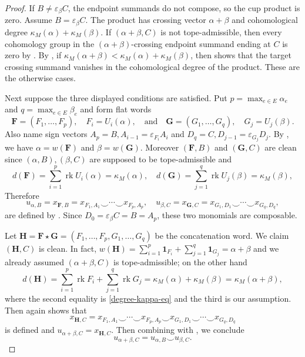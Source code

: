 \documentclass[10pt,a4paper]{amsart}
\newcommand{\bF}{\boldsymbol{F}}
\newcommand{\bG}{\boldsymbol{G}}
\newcommand{\bH}{\boldsymbol{H}}
\newcommand{\eps}{\varepsilon}
\newcommand{\one}{\mathbf{1}}
\newcommand{\rk}{\operatorname{rk}}
\begin{document}
\begin{proof}
If $B\neq\eps_\beta C$, the endpoint summands do not compose, so the cup product is zero. Assume $B=\eps_\beta C$. The product has crossing vector $\alpha+\beta$ and cohomological degree $\kappa_M(\alpha)+\kappa_M(\beta)$. If $(\alpha+\beta,C)$ is not tope-admissible, then every cohomology group in the $(\alpha+\beta)$-crossing endpoint summand ending at $C$ is zero by . By , if $\kappa_M(\alpha+\beta)<\kappa_M(\alpha)+\kappa_M(\beta)$, then  shows that the target crossing summand vanishes in the cohomological degree of the product. These are the otherwise cases.

Next suppose the three displayed conditions are satisfied. Put $p=\max_{e\in E}\alpha_e$ and $q=\max_{e\in E}\beta_e$ and form flat words
\[
\bF=(F_1,\ldots,F_p),\quad F_i=U_i(\alpha), \quad \text{and} \quad \bG=(G_1,\ldots,G_q),\quad G_j=U_j(\beta).
\]
Also name sign vectors $A_p=B, A_{i-1}=\eps_{F_i}A_i$ and $D_q=C, D_{j-1}=\eps_{G_j}D_j$. By , we have $\alpha=w(\bF)$ and $\beta=w(\bG)$. Moreover $(\bF,B)$ and $(\bG,C)$ are clean since $(\alpha,B),(\beta,C)$ are supposed to be tope-admissible and 
\begin{equation}\label{degree-kappa-eq}
d(\bF)=\sum_{i=1}^p\rk U_i(\alpha)=\kappa_M(\alpha),\quad d(\bG)=\sum_{j=1}^q\rk U_j(\beta)=\kappa_M(\beta),  
\end{equation}
Therefore
\begin{equation}\label{two-factors}
u_{\alpha,B}=x_{\bF,B}=x_{F_1,A_1}\smile\cdots\smile x_{F_p,A_p}, \quad u_{\beta,C}=x_{\bG,C}=x_{G_1,D_1}\smile\cdots\smile x_{G_q,D_q},
\end{equation}
are defined by . Since $D_0=\eps_\beta C=B=A_p$, these two monomials are composable.

Let $\bH=\bF\star\bG=(F_1,\ldots,F_p,G_1,\ldots,G_q)$ be the concatenation word. We claim $(\bH,C)$ is clean. In fact, $w(\bH)=\sum_{i=1}^p\one_{F_i}+\sum_{j=1}^q\one_{G_j}=\alpha+\beta$ and we already assumed $(\alpha+\beta,C)$ is tope-admissible; on the other hand
\[
d(\bH)=\sum_{i=1}^p\rk F_i+\sum_{j=1}^q\rk G_j=\kappa_M(\alpha)+\kappa_M(\beta)=\kappa_M(\alpha+\beta),
\]
where the second equality is \eqref{degree-kappa-eq} and the third is our assumption. Then  again shows that
\[
x_{\bH,C}=x_{F_1,A_1}\smile\cdots\smile x_{F_p,A_p}\smile x_{G_1,D_1}\smile\cdots\smile x_{G_q,D_q}
\]
is defined and $u_{\alpha+\beta,C}=x_{\bH,C}$. Then combining with , we conclude
\[
u_{\alpha+\beta,C}=u_{\alpha,B}\smile u_{\beta,C}.
\]
\end{proof}
\end{document}
